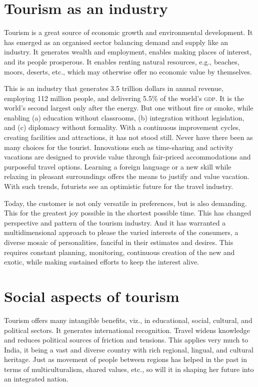
\section{Tourism as an industry} %
\label{sec:tai}

Tourism is a great source of economic growth and environmental development. It has emerged as an organised sector balancing demand and supply like an industry. It generates wealth and employment, enables making places of interest, and its people prosperous. It enables renting natural resources, e.g., beaches, moors, deserts, etc., which may otherwise offer no economic value by themselves.

This is an industry that generates 3.5 trillion dollars in annual revenue, employing 112 million people, and delivering 5.5\% of the world's \textsc{gdp}. It is the world's second largest only after the energy. But one without fire or smoke, while enabling (a) education without classrooms, (b) integration without legislation, and (c) diplomacy without formality. With a continuous improvement cycles, creating facilities and attractions, it has not stood still. Never have there been as many choices for the tourist. Innovations such as time-sharing and activity vacations are designed to provide value through fair-priced accommodations and purposeful travel options. Learning a foreign language or a new skill while relaxing in pleasant surroundings offers the means to justify and value vacation. With such trends, futurists see an optimistic future for the travel industry.

Today, the customer is not only versatile in preferences, but is also demanding. This for the greatest joy possible in the shortest possible time. This has changed perspective and pattern of the tourism industry. And it has warranted a multidimensional approach to please the varied interests of the consumers, a diverse mosaic of personalities, fanciful in their estimates and desires. This requires constant planning, monitoring, continuous creation of the new and exotic, while making sustained efforts to keep the interest alive.


\section{Social aspects of tourism} %
\label{sec:sat}

Tourism offers many intangible benefits, viz., in educational, social, cultural, and political sectors. It generates international recognition. Travel widens knowledge and reduces political sources of friction and tensions. This applies very much to India, it being a vast and diverse country with rich regional, lingual, and cultural heritage. Just as movement of people between regions has helped in the past in terms of multiculturalism, shared values, etc., so will it in shaping her future into an integrated nation.

